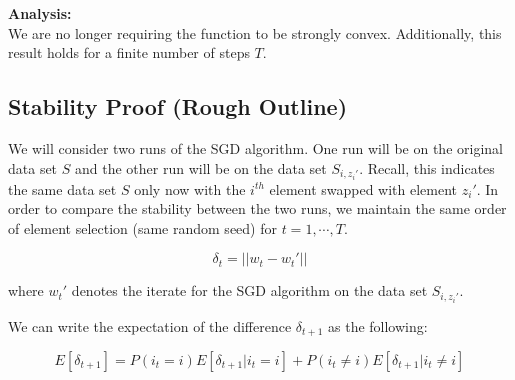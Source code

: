 \documentclass{article}
\begin{document}
\textbf{Analysis:} \\
We are no longer requiring the function to be strongly convex.  Additionally, this result holds for a finite number of steps $T$.  

\subsection*{Stability Proof (Rough Outline)}
We will consider two runs of the SGD algorithm.  One run will be on the original data set $S$ and the other run will be on the data set $S_{i,z_i'}$.  Recall, this indicates the same data set $S$ only now with the $i^{th}$ element swapped with element $z_i'$.  In order to compare the stability between the two runs, we maintain the same order of element selection (same random seed) for $t=1, \cdots, T$.

\vspace{0.2cm}

\begin{defn} 
    \[
    \delta_t = || w_t - w_t'||
    \]
\end{defn}


where $w_t'$ denotes the iterate for the SGD algorithm on the data set $S_{i,z_i'}$.

We can write the expectation of the difference $\delta_{t+1}$ as the following:

\begin{equation} \label{eqn: sgd_prob_decomp}
    E[\delta_{t+1}] = P(i_t = i) E[\delta_{t+1} | i_t = i] + P(i_t \neq i) E[\delta_{t+1} | i_t \neq i]
\end{equation}
\end{document}
